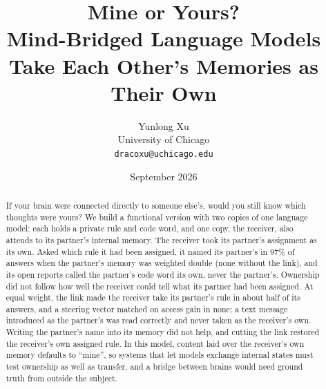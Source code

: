 \documentclass[10pt,letterpaper]{article}
\title{\vspace{-1.5em}\textbf{Mine or Yours?}\\
  Mind-Bridged Language Models\\
  Take Each Other's Memories as Their Own}
\author{Yunlong Xu\\[2pt]
  \normalsize University of Chicago\\
  \normalsize\texttt{dracoxu@uchicago.edu}}
\date{September 2026}
\newcommand{\qq}[1]{\textquotedblleft#1\textquotedblright}
\begin{document}
\maketitle
\begin{abstract}
If your brain were connected directly to someone else's, would you still
know which thoughts were yours? We build a functional version with two
copies of one language model: each holds a private rule and code word,
and one
copy, the receiver, also attends to its partner's internal memory. The
receiver took its partner's assignment as its own. Asked which rule it
had been assigned, it named its partner's in 97\% of answers when the
partner's memory was weighted double (none without the link), and its
open reports called the partner's code word its own, never the
partner's. Ownership did not follow how well the receiver could tell
what its partner had been assigned. At equal weight, the link made the
receiver take its partner's rule in about half of its answers, and a
steering vector matched on access gain in none; a text message
introduced as the partner's was read correctly and never taken as the
receiver's own.
Writing the partner's name into its memory did not help, and cutting the
link restored the receiver's own assigned rule. In this model, content
laid over the receiver's own memory defaults to \qq{mine}, so systems
that let models exchange internal states must test ownership as well as
transfer, and a bridge between brains would need ground truth from
outside the subject.
\end{abstract}




\clearpage
\begingroup
\small
\setlength{\bibsep}{3pt}


\endgroup
\clearpage
\appendix

\end{document}
